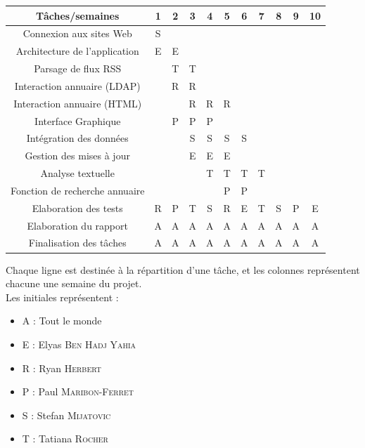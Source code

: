 \documentclass [pdftex,12pt] {report}
\begin{document}
\begin{table}[h!]
    \begin{tabular}{|c|c|c|c|c|c|c|c|c|c|c|}
        \hline
        Tâches/semaines                       & 1 & 2 & 3 & 4 & 5 & 6 & 7 & 8 & 9 & 10 \\ \hline
        Connexion aux sites Web               & S & ~ & ~ & ~ & ~ & ~ & ~ & ~ & ~ & ~ \\ \hline
        Architecture de l'application         & E & E & ~ & ~ & ~ & ~ & ~ & ~ & ~ & ~ \\ \hline
        Parsage de flux RSS                   & ~ & T & T & ~ & ~ & ~ & ~ & ~ & ~ & ~ \\ \hline
        Interaction annuaire (LDAP)    		  & ~ & R & R & ~ & ~ & ~ & ~ & ~ & ~ & ~ \\ \hline
        Interaction annuaire (HTML)			  & ~ & ~ & R & R & R & ~ & ~ & ~ & ~ & ~ \\ \hline
        Interface Graphique                   & ~ & P & P & P & ~ & ~ & ~ & ~ & ~ & ~ \\ \hline
        Intégration des données				  & ~ & ~ & S & S & S & S & ~ & ~ & ~ & ~ \\ \hline
        Gestion des mises à jour              & ~ & ~ & E & E & E & ~ & ~ & ~ & ~ & ~ \\ \hline
        Analyse textuelle                     & ~ & ~ & ~ & T & T & T & T & ~ & ~ & ~ \\ \hline
        Fonction de recherche annuaire 		  & ~ & ~ & ~ & ~ & P & P & ~ & ~ & ~ & ~ \\ \hline
        Elaboration des tests                 & R & P & T & S & R & E & T & S & P & E \\ \hline
        Elaboration du rapport                & A & A & A & A & A & A & A & A & A & A \\ \hline
        Finalisation des tâches               & A & A & A & A & A & A & A & A & A & A \\
        \hline
    \end{tabular}
\end{table}
Chaque ligne est destinée à la répartition d'une tâche, et les colonnes représentent chacune une semaine du projet.\\
Les initiales représentent :\\
\begin{itemize}
\item A : Tout le monde
\item E : Elyas \textsc{Ben Hadj Yahia}
\item R : Ryan \textsc{Herbert}
\item P : Paul \textsc{Maribon-Ferret}
\item S : Stefan \textsc{Mijatovic}
\item T : Tatiana \textsc{Rocher}
\end{itemize}
\end{document}
